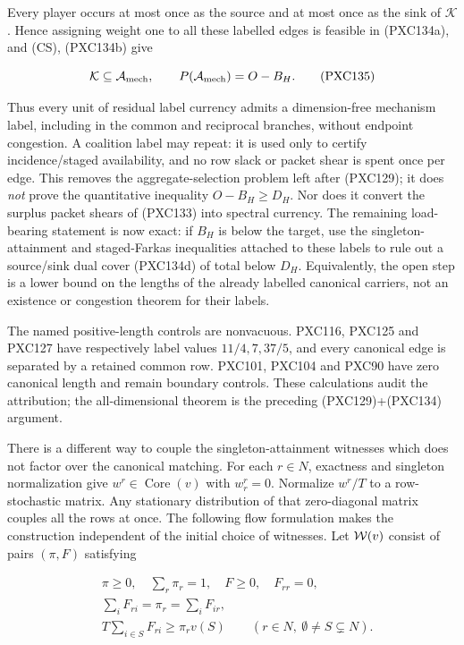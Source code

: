 \documentclass[11pt]{article}
\newcommand{\core}{\operatorname{Core}}
\begin{document}
Every player occurs at most once as the source and at most once as the sink
of \(\mathcal K\).  Hence assigning weight one to all these labelled edges is
feasible in (PXC134a), and (CS), (PXC134b) give

\begin{equation}
 \mathcal K\subseteq\mathcal A_{\rm mech},\qquad
 P(\mathcal A_{\rm mech})=O-B_H.                         \tag{PXC135}
\end{equation}

Thus every unit of residual label currency admits a dimension-free
mechanism label, including in the common and reciprocal branches, without
endpoint congestion.  A coalition label may repeat: it is used only to
certify incidence/staged availability, and no row slack or packet shear is
spent once per edge.  This removes the aggregate-selection problem
left after (PXC129); it does \emph{not} prove the quantitative inequality
\(O-B_H\ge D_H\).  Nor does it convert the surplus packet shears of
(PXC133) into spectral currency.  The remaining load-bearing statement is
now exact: if \(B_H\) is below the target, use the singleton-attainment and
staged-Farkas inequalities attached to these labels to rule out a
source/sink dual cover (PXC134d) of total below \(D_H\).  Equivalently, the
open step is a lower bound on the lengths of the already labelled canonical
carriers, not an existence or congestion theorem for their labels.

The named positive-length controls are nonvacuous.  PXC116, PXC125 and
PXC127 have respectively label values \(11/4,7,37/5\), and every canonical
edge is separated by a retained common row.  PXC101, PXC104 and PXC90 have
zero canonical length and remain boundary controls.  These calculations
audit the attribution; the all-dimensional theorem is the preceding
(PXC129)+(PXC134) argument.

There is a different way to couple the singleton-attainment witnesses which
does not factor over the canonical matching.  For each \(r\in N\), exactness
and singleton normalization give \(w^r\in\core(v)\) with \(w^r_r=0\).
Normalize \(w^r/T\) to a row-stochastic matrix.  Any stationary distribution
of that zero-diagonal matrix couples all the rows at once.  The following
flow formulation makes the construction independent of the initial choice
of witnesses.  Let \({\cal W}(v)\) consist of pairs \((\pi,F)\) satisfying

\begin{align}
 &\pi\ge0,\quad \sum_r\pi_r=1,\quad F\ge0,\quad F_{rr}=0,\\
 &\sum_iF_{ri}=\pi_r=\sum_iF_{ir},\\
 &T\sum_{i\in S}F_{ri}\ge \pi_rv(S)
       \qquad(r\in N,\ \emptyset\ne S\subsetneq N).       \tag{PXC136a}
\end{align}
\end{document}
